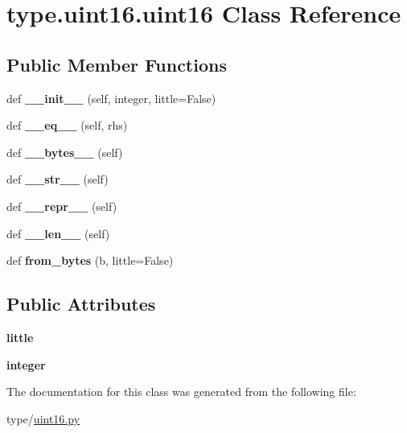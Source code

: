 \hypertarget{classtype_1_1uint16_1_1uint16}{}\section{type.\+uint16.\+uint16 Class Reference}
\label{classtype_1_1uint16_1_1uint16}
\subsection*{Public Member Functions}
\begin{DoxyCompactItemize}
\item 
\mbox{\label{classtype_1_1uint16_1_1uint16_a928d4bd499dd19db4827d9ec99d52213}} 
def {\bfseries \+\_\+\+\_\+init\+\_\+\+\_\+} (self, integer, little=False)
\item 
\mbox{\label{classtype_1_1uint16_1_1uint16_a030a8ba970380ad8cae59ca1b0d4e8cc}} 
def {\bfseries \+\_\+\+\_\+eq\+\_\+\+\_\+} (self, rhs)
\item 
\mbox{\label{classtype_1_1uint16_1_1uint16_a1096a47eba9cb85ae42e6fc6521d35a2}} 
def {\bfseries \+\_\+\+\_\+bytes\+\_\+\+\_\+} (self)
\item 
\mbox{\label{classtype_1_1uint16_1_1uint16_afaf19ea2a221724dbb708282a057f0fd}} 
def {\bfseries \+\_\+\+\_\+str\+\_\+\+\_\+} (self)
\item 
\mbox{\label{classtype_1_1uint16_1_1uint16_a110eadfbd8ec358ba0b82820fcd0971e}} 
def {\bfseries \+\_\+\+\_\+repr\+\_\+\+\_\+} (self)
\item 
\mbox{\label{classtype_1_1uint16_1_1uint16_a7fc79baa890165a6ce4bcf84cbadf73f}} 
def {\bfseries \+\_\+\+\_\+len\+\_\+\+\_\+} (self)
\item 
\mbox{\label{classtype_1_1uint16_1_1uint16_a39d41219a330fc9686e554fbc257d9d9}} 
def {\bfseries from\+\_\+bytes} (b, little=False)
\end{DoxyCompactItemize}
\subsection*{Public Attributes}
\begin{DoxyCompactItemize}
\item 
\mbox{\label{classtype_1_1uint16_1_1uint16_aeec0b73c3a73dc4c14667ec1f3322164}} 
{\bfseries little}
\item 
\mbox{\label{classtype_1_1uint16_1_1uint16_a9891664c638b44a0cc5a109da11d4103}} 
{\bfseries integer}
\end{DoxyCompactItemize}


The documentation for this class was generated from the following file\+:\begin{DoxyCompactItemize}
\item 
type/\mbox{\hyperlink{uint16_8py}{uint16.\+py}}\end{DoxyCompactItemize}
